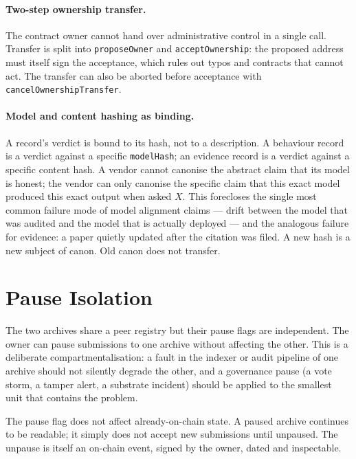 \documentclass[11pt,a4paper]{article}
\begin{document}
\paragraph{Two-step ownership transfer.} The contract owner
cannot hand over administrative control in a single call.
Transfer is split into \texttt{proposeOwner} and
\texttt{acceptOwnership}: the proposed address must itself sign
the acceptance, which rules out typos and contracts that
cannot act. The transfer can also be aborted before acceptance
with \texttt{cancelOwnershipTransfer}.

\paragraph{Model and content hashing as binding.} A record's
verdict is bound to its hash, not to a description. A
behaviour record is a verdict against a specific
\texttt{modelHash}; an evidence record is a verdict against a
specific content hash. A vendor cannot canonise the abstract
claim that its model is honest; the vendor can only canonise
the specific claim that this exact model produced this exact
output when asked $X$. This forecloses the single most common
failure mode of model alignment claims --- drift between the
model that was audited and the model that is actually
deployed --- and the analogous failure for evidence: a paper
quietly updated after the citation was filed. A new hash is a
new subject of canon. Old canon does not transfer.

\section{Pause Isolation}

The two archives share a peer registry but their pause flags are
independent. The owner can pause submissions to one archive
without affecting the other. This is a deliberate
compartmentalisation: a fault in the indexer or audit pipeline
of one archive should not silently degrade the other, and a
governance pause (a vote storm, a tamper alert, a substrate
incident) should be applied to the smallest unit that contains
the problem.

The pause flag does not affect already-on-chain state. A paused
archive continues to be readable; it simply does not accept new
submissions until unpaused. The unpause is itself an on-chain
event, signed by the owner, dated and inspectable.
\end{document}
